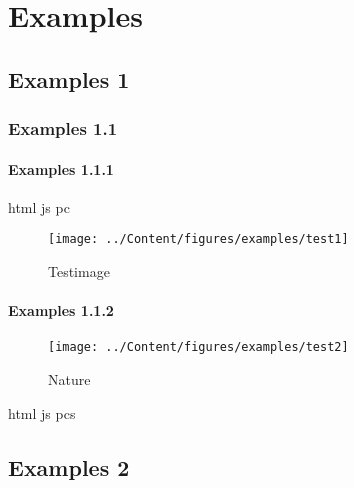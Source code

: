 \chapter{Examples}
\section{Examples 1}
\subsection{Examples 1.1}

\subsubsection{Examples 1.1.1}
\ac{html} \ac{js} \ac{pc}

\lipsum[1]
\begin{figure}[H]
\centering
\texttt{[image: ../Content/figures/examples/test1]}
\caption{Testimage}\label{fig:test1}
\end{figure}

\subsubsection{Examples 1.1.2}

\begin{figure}[H]
\centering
\texttt{[image: ../Content/figures/examples/test2]}
\caption{Nature}\label{fig:test2}
\end{figure}

\lipsum[1] \ac{html} \ac{js} \acp{pc} \cite{lam94} \cite{ghjv94}

\section{Examples 2}
\lipsum[1]
